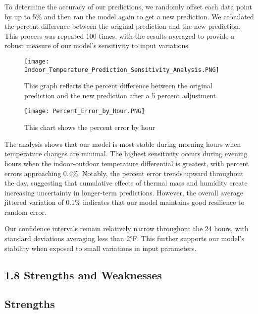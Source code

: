 \documentclass{article}
\begin{document}
To determine the accuracy of our predictions, we randomly offset each data point by up to 5\% and then ran the model again to get a new prediction. We calculated the percent difference between the original prediction and the new prediction. This process was repeated 100 times, with the results averaged to provide a robust measure of our model's sensitivity to input variations.
\begin{figure}[h]
    \label{fig:Indoor Temperature Prediction Sensitivity Analysis}
    \centering
    \texttt{[image: Indoor\_Temperature\_Prediction\_Sensitivity\_Analysis.PNG]}
    \vskip 10pt
    \parbox{0.5\linewidth}{This graph reflects the percent difference between the original prediction and the new prediction after a 5 percent adjustment.}
    
\end{figure}

\begin{figure}[h]
    \label{fig:Percent Error by Hour}
    \centering
    \texttt{[image: Percent\_Error\_by\_Hour.PNG]}
    \vskip 10pt
    \parbox{0.5\linewidth}{This chart shows the percent error by hour}
 
\end{figure}
The analysis shows that our model is most stable during morning hours when temperature changes are minimal. The highest sensitivity occurs during evening hours when the indoor-outdoor temperature differential is greatest, with percent errors approaching 0.4\%. Notably, the percent error trends upward throughout the day, suggesting that cumulative effects of thermal mass and humidity create increasing uncertainty in longer-term predictions. However, the overall average jittered variation of 0.1\% indicates that our model maintains good resilience to random error.

Our confidence intervals remain relatively narrow throughout the 24 hours, with standard deviations averaging less than 2°F. This further supports our model's stability when exposed to small variations in input parameters.

\subsection*{1.8 Strengths and Weaknesses}

\subsection*{Strengths}
\end{document}
